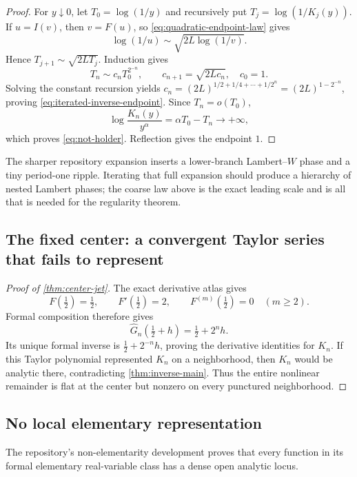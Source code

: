 \documentclass[11pt,oneside]{article}
\theoremstyle{definition}
\theoremstyle{remark}
\newcommand{\half}{\tfrac12}
\begin{document}
\begin{proof}
For $y\downarrow0$, let $T_0=\log(1/y)$ and recursively put
$T_j=\log(1/K_j(y))$.  If $u=I(v)$, then $v=F(u)$, so
\eqref{eq:quadratic-endpoint-law} gives
\begin{equation}
 \log(1/u)\sim\sqrt{2L\log(1/v)}.
 \label{eq:one-inverse-log}
\end{equation}
Hence $T_{j+1}\sim\sqrt{2LT_j}$.  Induction gives
\[
 T_n\sim c_n T_0^{2^{-n}},
 \qquad c_{n+1}=\sqrt{2Lc_n},\quad c_0=1.
\]
Solving the constant recursion yields
$c_n=(2L)^{1/2+1/4+\cdots+1/2^n}=(2L)^{1-2^{-n}}$, proving
\eqref{eq:iterated-inverse-endpoint}.  Since $T_n=o(T_0)$,
\[
 \log\frac{K_n(y)}{y^\alpha}=\alpha T_0-T_n\longrightarrow+\infty,
\]
which proves \eqref{eq:not-holder}.  Reflection gives the endpoint $1$.
\end{proof}

The sharper repository expansion inserts a lower-branch Lambert--$W$ phase and a tiny
period-one ripple.  Iterating that full expansion should produce a hierarchy of nested
Lambert phases; the coarse law above is the exact leading scale and is all that is
needed for the regularity theorem.

\subsection{The fixed center: a convergent Taylor series that fails to represent}

\begin{proof}[Proof of \cref{thm:center-jet}]
The exact derivative atlas gives
\[
 F(\half)=\half,\qquad F'(\half)=2,
 \qquad F^{(m)}(\half)=0\quad(m\geq2).
\]
Formal composition therefore gives
\[
 \widehat G_n(\half+h)=\half+2^nh.
\]
Its unique formal inverse is $\half+2^{-n}h$, proving the derivative identities for
$K_n$.  If this Taylor polynomial represented $K_n$ on a neighborhood, then $K_n$
would be analytic there, contradicting \cref{thm:inverse-main}.  Thus the entire
nonlinear remainder is flat at the center but nonzero on every punctured neighborhood.
\end{proof}

\subsection{No local elementary representation}

The repository's non-elementarity development proves that every function in its
formal elementary real-variable class has a dense open analytic locus.
\end{document}
